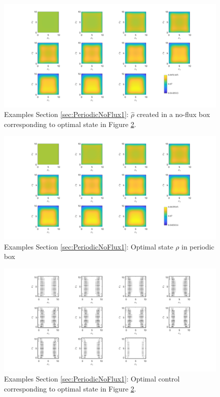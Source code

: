 \documentclass[11pt, a4paper]{article}
\theoremstyle{definition}
\newcommand{\hr}{\widehat \rho}
\begin{document}
\begin{figure}[h]
	\centering
	\includegraphics[scale=0.35]{rhoHatPeri2.png}
	\caption{Examples Section \ref{sec:PeriodicNoFlux1}: $\hr$ created in a no-flux box corresponding to optimal state in Figure \ref{F4d}.} 
	\label{F4c}
\end{figure}
\begin{figure}[h]
	\centering
	\includegraphics[scale=0.35]{rhoOptPeri2.png}
	\caption{Examples Section \ref{sec:PeriodicNoFlux1}: Optimal state $\rho$ in periodic box} 
	\label{F4d}
\end{figure}

\begin{figure}[h]
	\centering
	\includegraphics[scale=0.35]{ConOptPeri2.png}
	\caption{Examples Section \ref{sec:PeriodicNoFlux1}: Optimal control corresponding to optimal state in Figure \ref{F4d}.} 
	\label{F4e}
\end{figure}
\end{document}
